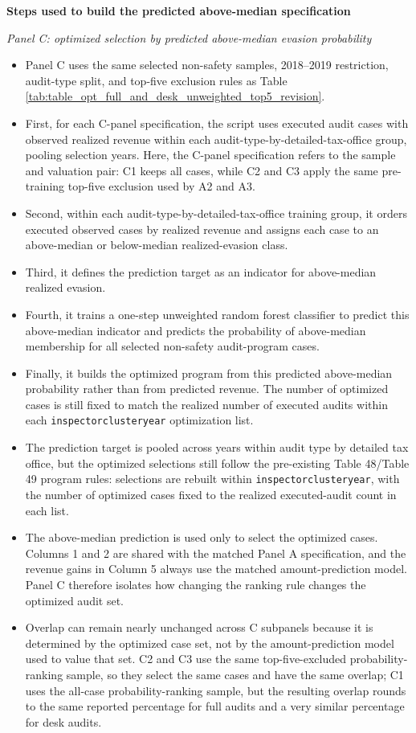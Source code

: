 \documentclass{article}
\begin{document}
\noindent\textbf{Steps used to build the predicted above-median specification}
\medskip

\noindent\textit{Panel C: optimized selection by predicted above-median evasion probability}
\begin{itemize}
\item Panel C uses the same selected non-safety samples, 2018--2019 restriction, audit-type split, and top-five exclusion rules as Table \ref{tab:table_opt_full_and_desk_unweighted_top5_revision}.
\item First, for each C-panel specification, the script uses executed audit cases with observed realized revenue within each audit-type-by-detailed-tax-office group, pooling selection years. Here, the C-panel specification refers to the sample and valuation pair: C1 keeps all cases, while C2 and C3 apply the same pre-training top-five exclusion used by A2 and A3.
\item Second, within each audit-type-by-detailed-tax-office training group, it orders executed observed cases by realized revenue and assigns each case to an above-median or below-median realized-evasion class.
\item Third, it defines the prediction target as an indicator for above-median realized evasion.
\item Fourth, it trains a one-step unweighted random forest classifier to predict this above-median indicator and predicts the probability of above-median membership for all selected non-safety audit-program cases.
\item Finally, it builds the optimized program from this predicted above-median probability rather than from predicted revenue. The number of optimized cases is still fixed to match the realized number of executed audits within each \texttt{inspectorclusteryear} optimization list.
\item The prediction target is pooled across years within audit type by detailed tax office, but the optimized selections still follow the pre-existing Table 48/Table 49 program rules: selections are rebuilt within \texttt{inspectorclusteryear}, with the number of optimized cases fixed to the realized executed-audit count in each list.
\item The above-median prediction is used only to select the optimized cases. Columns 1 and 2 are shared with the matched Panel A specification, and the revenue gains in Column 5 always use the matched amount-prediction model. Panel C therefore isolates how changing the ranking rule changes the optimized audit set.
\item Overlap can remain nearly unchanged across C subpanels because it is determined by the optimized case set, not by the amount-prediction model used to value that set. C2 and C3 use the same top-five-excluded probability-ranking sample, so they select the same cases and have the same overlap; C1 uses the all-case probability-ranking sample, but the resulting overlap rounds to the same reported percentage for full audits and a very similar percentage for desk audits.
\end{itemize}
\end{document}
